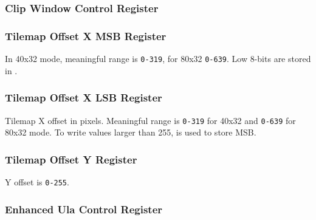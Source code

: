 \subsubsection{Clip Window Control Register }



\subsubsection{Tilemap Offset X MSB Register }

\begin{NextPort}
\end{NextPort}

In 40x32 mode, meaningful range is {\tt 0-319}, for 80x32 {\tt 0-639}. Low 8-bits are stored in .


\subsubsection{Tilemap Offset X LSB Register }

\begin{NextPort}
\end{NextPort}

Tilemap X offset in pixels. Meaningful range is {\tt 0-319} for 40x32 and {\tt 0-639} for 80x32 mode. To write values larger than 255,  is used to store MSB.


\subsubsection{Tilemap Offset Y Register }

\begin{NextPort}
\end{NextPort}

Y offset is {\tt 0-255}.


\subsubsection{Enhanced Ula Control Register }



